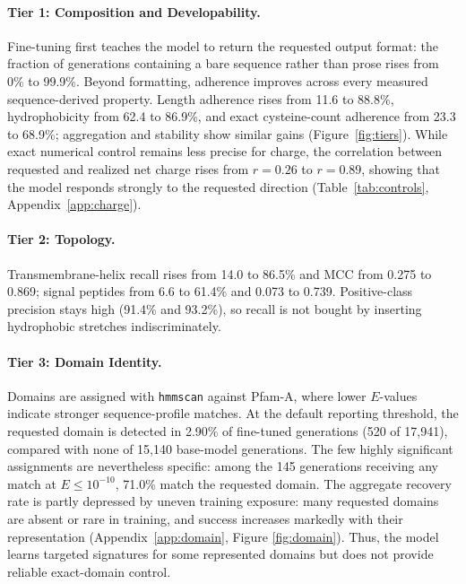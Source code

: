 \documentclass{article}
\newcommand{\pct}{\%}
\begin{document}
\paragraph{Tier 1: Composition and Developability.}
Fine-tuning first teaches the model to return the requested output format: the fraction of generations containing a bare sequence rather than prose rises from 0\pct{} to 99.9\pct. Beyond formatting, adherence improves across every measured sequence-derived property. Length adherence rises from 11.6 to 88.8\pct, hydrophobicity from 62.4 to 86.9\pct, and exact cysteine-count adherence from 23.3 to 68.9\pct; aggregation and stability show similar gains (Figure~\ref{fig:tiers}).
While exact numerical control remains less precise for charge, the correlation between requested and realized net charge rises from $r=0.26$ to $r=0.89$, showing that the model responds strongly to the requested direction (Table~\ref{tab:controls}, Appendix~\ref{app:charge}). 

\paragraph{Tier 2: Topology.} Transmembrane-helix recall rises from 14.0 to
86.5\pct{} and MCC from 0.275 to 0.869; signal peptides from 6.6 to 61.4\pct{}
and 0.073 to 0.739. Positive-class precision stays high (91.4\pct{} and 93.2\pct), so
recall is not bought by inserting hydrophobic stretches indiscriminately.

\paragraph{Tier 3: Domain Identity.}
Domains are assigned with \texttt{hmmscan} against Pfam-A, where lower $E$-values indicate stronger sequence-profile matches. At the default reporting threshold, the requested domain is detected in 2.90\% of fine-tuned generations (520 of 17{,}941), compared with none of 15{,}140 base-model generations. The few highly significant assignments are nevertheless specific: among the 145 generations receiving any match at $E\leq10^{-10}$, 71.0\% match the requested domain. The aggregate recovery rate is partly depressed by uneven training exposure: many requested domains are absent or rare in training, and success increases markedly with their representation (Appendix~\ref{app:domain}, Figure \ref{fig:domain}). Thus, the model learns targeted signatures for some represented domains but does not provide reliable exact-domain control.
\end{document}
